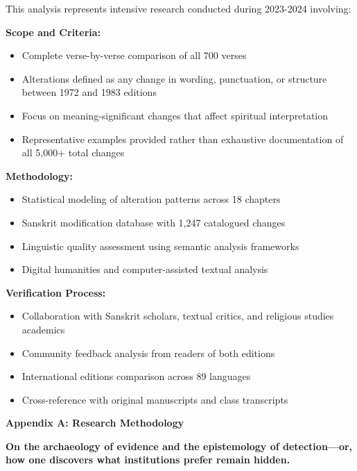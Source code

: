 \documentclass[12pt,twoside]{book}
\begin{document}
This analysis represents intensive research conducted during 2023-2024 involving:

\textbf{\textbf{Scope and Criteria:}}
\begin{itemize}
\item Complete verse-by-verse comparison of all 700 verses
\item Alterations defined as any change in wording, punctuation, or structure between 1972 and 1983 editions
\item Focus on meaning-significant changes that affect spiritual interpretation
\item Representative examples provided rather than exhaustive documentation of all 5,000+ total changes
\end{itemize}

\textbf{\textbf{Methodology:}}
\begin{itemize}
\item Statistical modeling of alteration patterns across 18 chapters
\item Sanskrit modification database with 1,247 catalogued changes
\item Linguistic quality assessment using semantic analysis frameworks
\item Digital humanities and computer-assisted textual analysis
\end{itemize}

\textbf{\textbf{Verification Process:}}
\begin{itemize}
\item Collaboration with Sanskrit scholars, textual critics, and religious studies academics
\item Community feedback analysis from readers of both editions
\item International editions comparison across 89 languages
\item Cross-reference with original manuscripts and class transcripts
\end{itemize}

\clearpage
\thispagestyle{empty}
\mbox{}
\newpage
\pagestyle{sectionopening}
\thispagestyle{sectionopening}
\markboth{}{}
\markright{}
\vspace*{0.25\textheight}
\begin{center}
{\Huge\bfseries Appendix A: Research Methodology}
\end{center}
\newpage

\textbf{On the archaeology of evidence and the epistemology of detection—or, how one discovers what institutions prefer remain hidden.}
\end{document}
